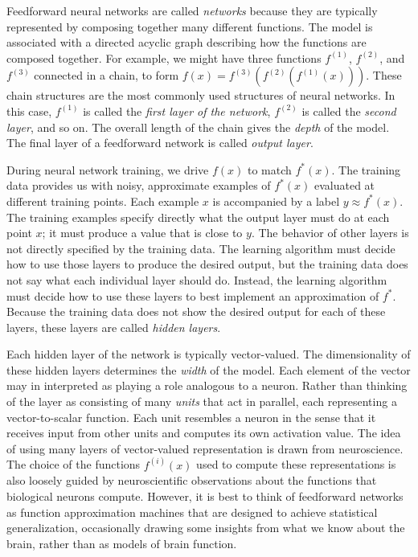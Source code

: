 \documentclass{report}
\begin{document}
\noindent Feedforward neural networks are called \textit{networks} because they are typically represented by composing together many different functions. The model is associated with a directed acyclic graph describing how the functions are composed together. For example, we might have three functions $f^{(1)}$, $f^{(2)}$, and $f^{(3)}$ connected in a chain, to form $f(x) = f^{(3)}(f^{(2)}(f^{(1)}(x)))$. These chain structures are the most commonly used structures of neural networks. In this case, $f^{(1)}$ is called the \textit{first layer of the network}, $f^{(2)}$ is called the \textit{second layer}, and so on. The overall length of the chain gives the \textit{depth} of the model. The final layer of a feedforward network is called \textit{output layer}.\newline

\noindent During neural network training, we drive $f(x)$ to match $f^*(x)$. The training data provides us with noisy, approximate examples of $f^*(x)$ evaluated at different training points. Each example $x$ is accompanied by a label $y \approx f^*(x)$. The training examples specify directly what the output layer must do at each point $x$; it must produce a value that is close to $y$. The behavior of other layers is not directly specified by the training data. The learning algorithm must decide how to use those layers to produce the desired output, but the training data does not say what each individual layer should do. Instead, the learning algorithm must decide how to use these layers to best implement an approximation of $f^*$. Because the training data does not show the desired output for each of these layers, these layers are called \textit{hidden layers}.\newline

\noindent Each hidden layer of the network is typically vector-valued. The dimensionality of these hidden layers determines the \textit{width} of the model. Each element of the vector may in interpreted as playing a role analogous to a neuron. Rather than thinking of the layer as consisting of many \textit{units} that act in parallel, each representing a vector-to-scalar function. Each unit resembles a neuron in the sense that it receives input from other units and computes its own activation value. The idea of using many layers of vector-valued representation is drawn from neuroscience. The choice of the functions $f^{(i)}(x)$ used to compute these representations is also loosely guided by neuroscientific observations about the functions that biological neurons compute. However, it is best to think of feedforward networks as function approximation machines that are designed to achieve statistical generalization, occasionally drawing some insights from what we know about the brain, rather than as models of brain function.\newline
\end{document}
